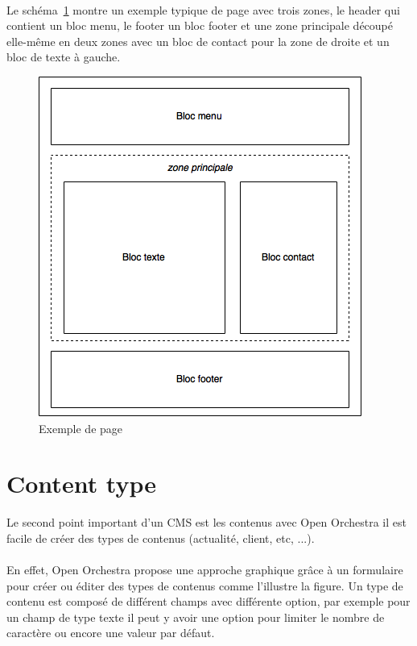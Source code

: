          \paragraph{}
		Le schéma~\ref{node} montre un exemple typique de page avec trois zones, le header qui contient un bloc menu, le footer un bloc footer et une zone principale découpé elle-même en deux zones avec un bloc de contact pour la zone de droite et un bloc de texte à gauche.
		\begin{figure}[H]
        \begin{center}
          \includegraphics[scale=1]{images/node}
        \end{center}
        \caption{Exemple de page}
        \label{node}
      \end{figure}
         \section{Content type}
         Le second point important d'un CMS est les contenus avec Open Orchestra il est facile de créer des types de contenus (actualité, client, etc, ...).
          \paragraph{}
          En effet, Open Orchestra propose une approche graphique grâce à un formulaire pour créer ou éditer des types de contenus comme l'illustre la figure.
          Un type de contenu est composé de différent champs avec différente option, par exemple pour un champ de type texte il peut y avoir une option pour limiter le nombre de caractère ou encore une valeur par défaut.
